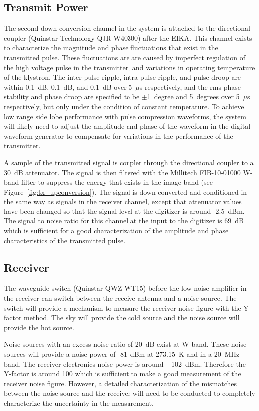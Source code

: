 \documentclass[12pt,letterpaper]{article}
\begin{document}
\subsection{Transmit Power}

The second down-conversion channel in the system is attached to the
directional coupler (Quinstar Technology QJR-W40300) after the
EIKA. This channel exists to characterize the magnitude and phase
fluctuations that exist in the transmitted pulse. These fluctuations
are are caused by imperfect regulation of the high voltage pulse in
the transmitter, and variations in operating temperature of the
klystron. The inter pulse ripple, intra pulse ripple, and pulse droop
are within 0.1~dB, 0.1~dB, and 0.1~dB over 5~$\mu$s respectively, and
the rms phase stability and phase droop are specified to be
$\pm$1~degree and 5~degrees over 5~$\mu$s respectively, but only under
the condition of constant temperature. To achieve low range side lobe
performance with pulse compression waveforms, the system will likely
need to adjust the amplitude and phase of the waveform in the digital
waveform generator to compensate for variations in the performance of
the transmitter.

A sample of the transmitted signal is coupler through the directional
coupler to a 30~dB attenuator. The signal is then filtered with the
Millitech FIB-10-01000 W-band filter to suppress the energy that
exists in the image band (see Figure~\ref{fig:tx_upconversion}). The
signal is down-converted and conditioned in the same way as signals in
the receiver channel, except that attenuator values have been changed
so that the signal level at the digitizer is around -2.5~dBm. The
signal to noise ratio for this channel at the input to the digitizer
is 69~dB which is sufficient for a good characterization of the
amplitude and phase characteristics of the transmitted pulse.

\subsection{Receiver}

The waveguide switch (Quinstar QWZ-WT15) before the low noise
amplifier in the receiver can switch between the receive antenna and a
noise source. The switch will provide a mechanism to measure the
receiver noise figure with the Y-factor method. The sky will provide
the cold source and the noise source will provide the hot source.

Noise sources with an excess noise ratio of 20~dB exist at
W-band. These noise sources will provide a noise power of -81~dBm at
273.15~K and in a 20~MHz band. The receiver electronics noise power is
around $-$102~dBm. Therefore the Y-factor is around 100 which is
sufficient to make a good measurement of the receiver noise
figure. However, a detailed characterization of the mismatches between
the noise source and the receiver will need to be conducted to
completely characterize the uncertainty in the measurement.
\end{document}
